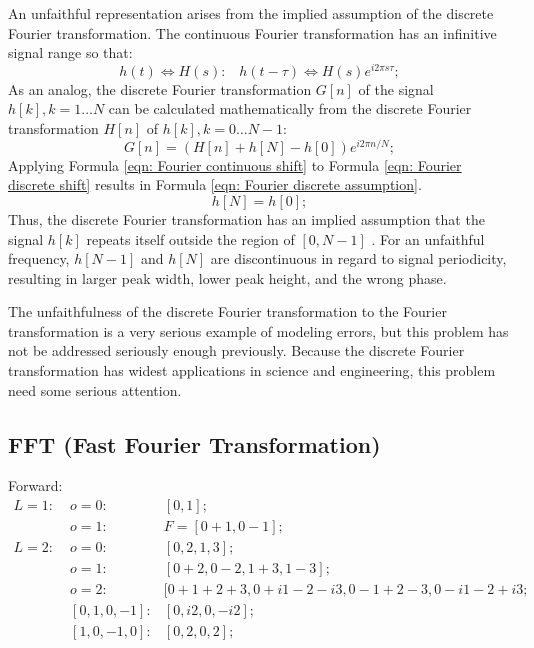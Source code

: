 \documentclass[twoside]{article}
\numberwithin{equation}{section}
\newcommand{\eqspace}{\;\;\;}
\begin{document}
An unfaithful representation arises from the implied assumption of the discrete Fourier transformation.  
The continuous Fourier transformation has an infinitive signal range so that:
\begin{equation}
\label{eqn: Fourier continuous shift}
h(t) \Leftrightarrow H(s): \eqspace h(t - \tau) \Leftrightarrow H(s) e^{i 2\pi s \tau};
\end{equation}
As an analog, the discrete Fourier transformation $G[n]$ of the signal $h[k], k = 1 \dots N$ can be calculated mathematically from the discrete Fourier transformation $H[n]$ of $h[k], k = 0\dots N-1$:
\begin{equation}
\label{eqn: Fourier discrete shift}
G[n] = (H[n] + h[N] - h[0]) e^{i 2\pi n/N};
\end{equation}
Applying Formula \eqref{eqn: Fourier continuous shift} to Formula \eqref{eqn: Fourier discrete shift} results in Formula \eqref{eqn: Fourier discrete assumption}.
\begin{equation}
\label{eqn: Fourier discrete assumption}
h[N] = h[0];
\end{equation}
Thus, the discrete Fourier transformation has an implied assumption that the signal $h[k]$ repeats itself outside the region of $[0, N-1]$ \cite{Numerical_DFT}.  
For an unfaithful frequency, $h[N-1]$ and $h[N]$ are discontinuous in regard to signal periodicity, resulting in larger peak width, lower peak height, and the wrong phase.  

The unfaithfulness of the discrete Fourier transformation to the Fourier transformation is a very serious example of modeling errors, but this problem has not be addressed seriously enough previously.
Because the discrete Fourier transformation has widest applications in science and engineering, this problem need some serious attention.


\subsection{FFT (Fast Fourier Transformation)}

\iffalse

Forward:
\begin{align*}
L = 1:\;& o=0: & [0, 1]; \\
 & o = 1: & F = [0 + 1, 0 - 1]; \\
L = 2:\;& o=0: & [0, 2, 1, 3]; \\
 & o = 1: & [0 + 2, 0 - 2, 1 + 3, 1 - 3]; \\
 & o = 2: & [0 + 1 + 2 + 3, 0 + i 1 - 2 - i 3 , 0 - 1 + 2 - 3, 0 - i 1 - 2 + i 3; \\
 & [0, 1, 0, -1]:& [0, i 2, 0, - i 2]; \\
 & [1, 0, -1, 0]:& [0, 2, 0, 2];
\end{align*}
\end{document}
